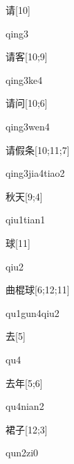 \begin{verbete}[qing3]{请}[10]
\begin{pronuncia}{qing3}
\end{pronuncia}
\end{verbete}

\begin{verbete}[qing3ke4]{请客}[10;9]
\begin{pronuncia}{qing3ke4}
\end{pronuncia}
\end{verbete}

\begin{verbete}{请问}[10;6]
\begin{pronuncia}{qing3wen4}
\end{pronuncia}
\end{verbete}

\begin{verbete}{请假条}[10;11;7]
\begin{pronuncia}{qing3jia4tiao2}
\end{pronuncia}
\end{verbete}

\begin{verbete}{秋天}[9;4]
\begin{pronuncia}{qiu1tian1}
\end{pronuncia}
\end{verbete}

\begin{verbete}[qiu2]{球}[11]
\begin{pronuncia}{qiu2}
\end{pronuncia}
\end{verbete}

\begin{verbete}{曲棍球}[6;12;11]
\begin{pronuncia}{qu1gun4qiu2}
\end{pronuncia}
\end{verbete}

\begin{verbete}[qu4]{去}[5]
\begin{pronuncia}{qu4}
\end{pronuncia}
\end{verbete}

\begin{verbete}[qu4nian2]{去年}[5;6]
\begin{pronuncia}{qu4nian2}
\end{pronuncia}
\end{verbete}

\begin{verbete}[qun2zi0]{裙子}[12;3]
\begin{pronuncia}{qun2zi0}
\end{pronuncia}
\end{verbete}

